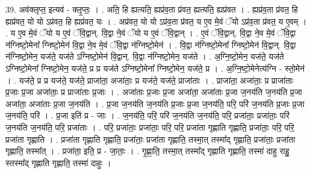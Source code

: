 \documentclass[17pt]{extarticle}
\begin{document}
39. अव॑क्लृप्त॒ इत्यव॑ - क्लृ॒प्तः॒ । . अति॒ हि ह्यत्यति॒ ह्यप्र॑व॒ता प्र॑वत॒ ह्यत्यति॒ ह्यप्र॑वत । . ह्यप्र॑व॒ता प्र॑वत॒ हि ह्यप्र॑वत॒ यो यो ऽप्र॑वत॒ हि ह्यप्र॑वत॒ यः । . अप्र॑वत॒ यो यो ऽप्र॑व॒ता प्र॑वत॒ य ए॒व मे॒वं ॅयो ऽप्र॑व॒ता प्र॑वत॒ य ए॒वम् । . य ए॒व मे॒वं ॅयो य ए॒वं ॅवि॒द्वान्. वि॒द्वा ने॒वं ॅयो य ए॒वं ॅवि॒द्वान् । . ए॒वं ॅवि॒द्वान्. वि॒द्वा ने॒व मे॒वं ॅवि॒द्वा न॑ग्निष्टो॒मेना᳚ ग्निष्टो॒मेन॑ वि॒द्वा ने॒व मे॒वं ॅवि॒द्वा न॑ग्निष्टो॒मेन॑ । . वि॒द्वा न॑ग्निष्टो॒मेना᳚ ग्निष्टो॒मेन॑ वि॒द्वान्. वि॒द्वा न॑ग्निष्टो॒मेन॒ यज॑ते॒ यज॑ते ऽग्निष्टो॒मेन॑ वि॒द्वान्. वि॒द्वा न॑ग्निष्टो॒मेन॒ यज॑ते । . अ॒ग्नि॒ष्टो॒मेन॒ यज॑ते॒ यज॑ते ऽग्निष्टो॒मेना᳚ ग्निष्टो॒मेन॒ यज॑ते॒ प्र प्र यज॑ते ऽग्निष्टो॒मेना᳚ ग्निष्टो॒मेन॒ यज॑ते॒ प्र । . अ॒ग्नि॒ष्टो॒मेनेत्य॑ग्नि - स्तो॒मेन॑ । . यज॑ते॒ प्र प्र यज॑ते॒ यज॑ते॒ प्राजा॑ता॒ अजा॑ताः॒ प्र यज॑ते॒ यज॑ते॒ प्राजा॑ताः । . प्राजा॑ता॒ अजा॑ताः॒ प्र प्राजा॑ताः प्र॒जाः प्र॒जा अजा॑ताः॒ प्र प्राजा॑ताः प्र॒जाः । . अजा॑ताः प्र॒जाः प्र॒जा अजा॑ता॒ अजा॑ताः प्र॒जा ज॒नय॑ति ज॒नय॑ति प्र॒जा अजा॑ता॒ अजा॑ताः प्र॒जा ज॒नय॑ति । . प्र॒जा ज॒नय॑ति ज॒नय॑ति प्र॒जाः प्र॒जा ज॒नय॑ति॒ परि॒ परि॑ ज॒नय॑ति प्र॒जाः प्र॒जा ज॒नय॑ति॒ परि॑ । . प्र॒जा इति॑ प्र - जाः । . ज॒नय॑ति॒ परि॒ परि॑ ज॒नय॑ति ज॒नय॑ति॒ परि॒ प्रजा॑ताः॒ प्रजा॑ताः॒ परि॑ ज॒नय॑ति ज॒नय॑ति॒ परि॒ प्रजा॑ताः । . परि॒ प्रजा॑ताः॒ प्रजा॑ताः॒ परि॒ परि॒ प्रजा॑ता गृह्णाति गृह्णाति॒ प्रजा॑ताः॒ परि॒ परि॒ प्रजा॑ता गृह्णाति । . प्रजा॑ता गृह्णाति गृह्णाति॒ प्रजा॑ताः॒ प्रजा॑ता गृह्णाति॒ तस्मा॒त् तस्मा᳚द् गृह्णाति॒ प्रजा॑ताः॒ प्रजा॑ता गृह्णाति॒ तस्मा᳚त् । . प्रजा॑ता॒ इति॒ प्र - जा॒ताः॒ । . गृ॒ह्णा॒ति॒ तस्मा॒त् तस्मा᳚द् गृह्णाति गृह्णाति॒ तस्मा॑ दाहु राहु॒ स्तस्मा᳚द् गृह्णाति गृह्णाति॒ तस्मा॑ दाहुः । \newline
\end{document}
